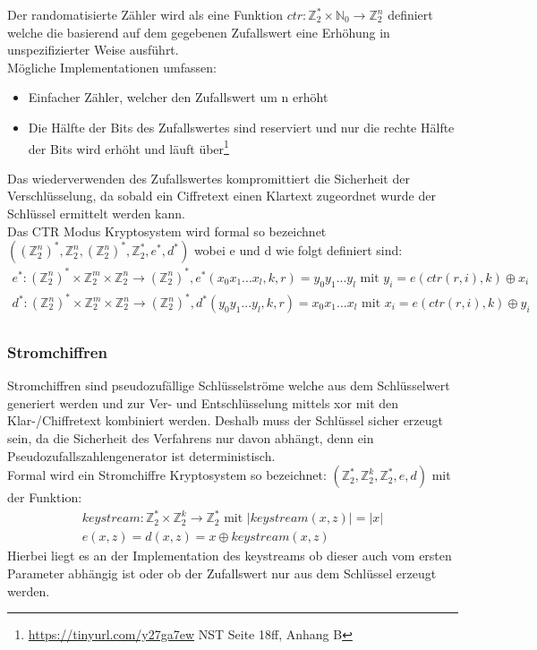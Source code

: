\documentclass[a4paper,12pt,leqno]{article}
\begin{document}
Der randomatisierte Zähler wird als eine Funktion $ctr: \mathbb{Z}_2^*\times \mathbb{N}_0\rightarrow \mathbb{Z}_2^n$  definiert welche die basierend auf dem gegebenen Zufallswert eine Erhöhung in unspezifizierter Weise ausführt.\\
Mögliche Implementationen umfassen:
\begin{itemize}
\item Einfacher Zähler, welcher den Zufallswert um n erhöht
\item  Die Hälfte der Bits des Zufallswertes sind reserviert und nur die rechte Hälfte der Bits wird erhöht und läuft über\footnote{\url{https://tinyurl.com/y27ga7ew} NST Seite 18ff, Anhang B}
\end{itemize}
Das wiederverwenden des Zufallswertes kompromittiert die Sicherheit der Verschlüsselung, da sobald ein Ciffretext einen Klartext zugeordnet wurde der Schlüssel ermittelt werden kann.\\
Das CTR Modus Kryptosystem wird formal so bezeichnet $((\mathbb{Z}_2^n)^*,\mathbb{Z}_2^n,(\mathbb{Z}_2^n)^*,\mathbb{Z}_2^*,e^*,d^*)$ wobei e und d wie folgt definiert sind:
\begin{align*}
e^*:(\mathbb{Z}_2^n)^*\times \mathbb{Z}_2^m \times \mathbb{Z}_2^n\rightarrow (\mathbb{Z}_2^n)^*, e^*(x_0x_1...x_l,k,r)=y_0y_1...y_l \textrm{ mit } y_i = e(ctr(r,i),k)\oplus x_i\\
d^*:(\mathbb{Z}_2^n)^*\times \mathbb{Z}_2^m \times \mathbb{Z}_2^n\rightarrow (\mathbb{Z}_2^n)^*, d^*(y_0y_1...y_l,k,r)=x_0x_1...x_l \textrm{ mit } x_i = e(ctr(r,i),k)\oplus y_i\\
\end{align*}
\subsubsection{Stromchiffren}
Stromchiffren sind pseudozufällige Schlüsselströme welche aus dem Schlüsselwert generiert werden und zur Ver- und Entschlüsselung mittels xor mit den Klar-/Chiffretext kombiniert werden. Deshalb muss der Schlüssel sicher erzeugt sein, da die Sicherheit des Verfahrens nur davon abhängt, denn ein Pseudozufallszahlengenerator ist deterministisch.\\
Formal wird ein Stromchiffre Kryptosystem so bezeichnet: $(\mathbb{Z}_2^*,\mathbb{Z}_2^k,\mathbb{Z}_2^*,e,d)$ mit der Funktion:
\begin{align*}
keystream: \mathbb{Z}_2^*\times \mathbb{Z}_2^k\rightarrow\mathbb{Z}_2^* \textrm{ mit } |keystream(x,z)|=|x|\\
e(x,z)=d(x,z) = x\oplus keystream(x,z)
\end{align*}
Hierbei liegt es an der Implementation des keystreams ob dieser auch vom ersten Parameter abhängig ist oder ob der Zufallswert nur aus dem Schlüssel erzeugt werden.
\end{document}
